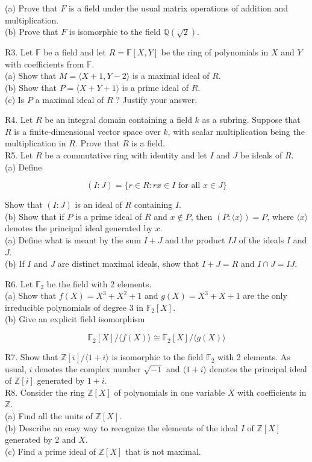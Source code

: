(a) Prove that $F$ is a field under the usual matrix operations of addition and multiplication.\\
(b) Prove that $F$ is isomorphic to the field $\mathbb{Q}(\sqrt{2})$.

R3. Let $\mathbb{F}$ be a field and let $R=\mathbb{F}[X, Y]$ be the ring of polynomials in $X$ and $Y$ with coefficients from $\mathbb{F}$.\\
(a) Show that $M=\langle X+1, Y-2\rangle$ is a maximal ideal of $R$.\\
(b) Show that $P=\langle X+Y+1\rangle$ is a prime ideal of $R$.\\
(c) Is $P$ a maximal ideal of $R$ ? Justify your answer.

R4. Let $R$ be an integral domain containing a field $k$ as a subring. Suppose that $R$ is a finite-dimensional vector space over $k$, with scalar multiplication being the multiplication in $R$. Prove that $R$ is a field.\\
R5. Let $R$ be a commutative ring with identity and let $I$ and $J$ be ideals of $R$.\\
(a) Define

$$
(I: J)=\{r \in R: r x \in I \text { for all } x \in J\}
$$

Show that $(I: J)$ is an ideal of $R$ containing $I$.\\
(b) Show that if $P$ is a prime ideal of $R$ and $x \notin P$, then $(P:\langle x\rangle)=P$, where $\langle x\rangle$ denotes the principal ideal generated by $x$.\\
(a) Define what is meant by the sum $I+J$ and the product $I J$ of the ideals $I$ and $J$.\\
(b) If $I$ and $J$ are distinct maximal ideals, show that $I+J=R$ and $I \cap J=I J$.

R6. Let $\mathbb{F}_{2}$ be the field with 2 elements.\\
(a) Show that $f(X)=X^{3}+X^{2}+1$ and $g(X)=X^{3}+X+1$ are the only irreducible polynomials of degree 3 in $\mathbb{F}_{2}[X]$.\\
(b) Give an explicit field isomorphism

$$
\mathbb{F}_{2}[X] /\langle f(X)\rangle \cong \mathbb{F}_{2}[X] /\langle g(X)\rangle
$$

R7. Show that $\mathbb{Z}[i] /\langle 1+i\rangle$ is isomorphic to the field $\mathbb{F}_{2}$ with 2 elements. As usual, $i$ denotes the complex number $\sqrt{-1}$ and $\langle 1+i\rangle$ denotes the principal ideal of $\mathbb{Z}[i]$ generated by $1+i$.\\
R8. Consider the ring $\mathbb{Z}[X]$ of polynomials in one variable $X$ with coefficients in $\mathbb{Z}$.\\
(a) Find all the units of $\mathbb{Z}[X]$.\\
(b) Describe an easy way to recognize the elements of the ideal $I$ of $\mathbb{Z}[X]$ generated by 2 and $X$.\\
(c) Find a prime ideal of $\mathbb{Z}[X]$ that is not maximal.

